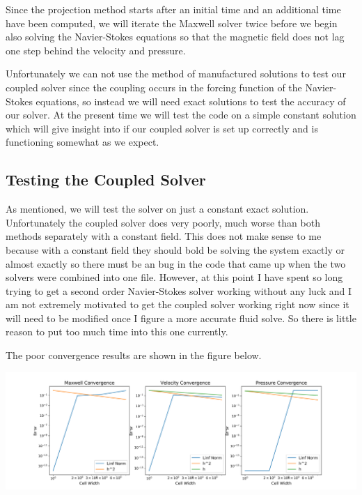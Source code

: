 \documentclass{article}
\begin{document}
   Since the projection method starts after an initial time and an additional time have been computed, we will iterate the Maxwell solver twice before we begin also solving the Navier-Stokes equations so that the magnetic field does not lag one step behind the velocity and pressure. 

   Unfortunately we can not use the method of manufactured solutions to test our coupled solver since the coupling occurs in the forcing function of the Navier-Stokes equations, so instead we will need exact solutions to test the accuracy of our solver. At the present time we will test the code on a simple constant solution which will give insight into if our coupled solver is set up correctly and is functioning somewhat as we expect. 


   \subsection*{Testing the Coupled Solver}

   As mentioned, we will test the solver on just a constant exact solution. Unfortunately the coupled solver does very poorly, much worse than both methods separately with a constant field. This does not make sense to me because with a constant field they should bold be solving the system exactly or almost exactly so there must be an bug in the code that came up when the two solvers were combined into one file. However, at this point I have spent so long trying to get a second order Navier-Stokes solver working without any luck and I am not extremely motivated to get the coupled solver working right now since it will need to be modified once I figure a more accurate fluid solve. So there is little reason to put too much time into this one currently. 

   The poor convergence results are shown in the figure below. 

                \begin{center}
                \includegraphics[scale=.4]{presentation/full_conv.png}
                \end{center}
\end{document}
